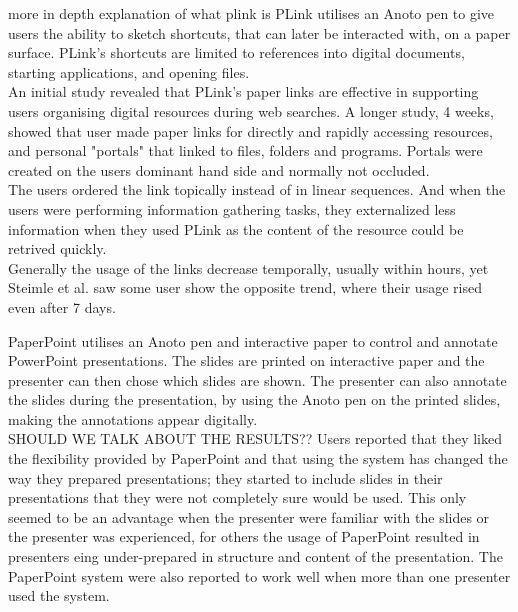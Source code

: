 
more in depth explanation of what plink is
PLink \cite{steimle2011plink} utilises an Anoto pen to give users the ability to sketch shortcuts, that can later be interacted with,  on a paper surface. PLink’s shortcuts are limited to references into digital documents, starting applications, and opening files. \\
An initial study revealed that PLink's paper links are effective in supporting users organising digital resources during web searches.
A longer study, 4 weeks, showed that user made paper links for directly and rapidly accessing resources, and personal "portals" that linked to files, folders and programs. Portals were created on the users dominant hand side and normally not occluded. \\
The users ordered the link topically instead of in linear sequences. And when the users were performing information gathering tasks, they externalized less information when they used PLink as the content of the resource could be retrived quickly. \\
Generally the usage of the links decrease temporally, usually within hours, yet Steimle et al. saw some user show the opposite trend, where their usage rised even after 7 days. \par

PaperPoint \cite{Signer:2007:PPP:1226969.1226981} utilises an Anoto\cite{anoto2011anoto} pen and interactive paper to control and annotate PowerPoint  presentations. The slides are printed on interactive paper and the presenter can then chose which slides are shown. The presenter can also annotate the slides during the presentation, by using the Anoto pen on the printed slides, making the annotations appear digitally. \\
SHOULD WE TALK ABOUT THE RESULTS??
Users reported that they liked the flexibility provided by PaperPoint and that using the system has changed the way they prepared presentations; they started to include slides in their presentations that they were not completely sure would be used. This only seemed to be an advantage when the presenter were familiar with the slides or the presenter was experienced, for others the usage of PaperPoint resulted in presenters eing under-prepared in structure and content of the presentation. The PaperPoint system were also reported to work well when more than one presenter used the system.\\

